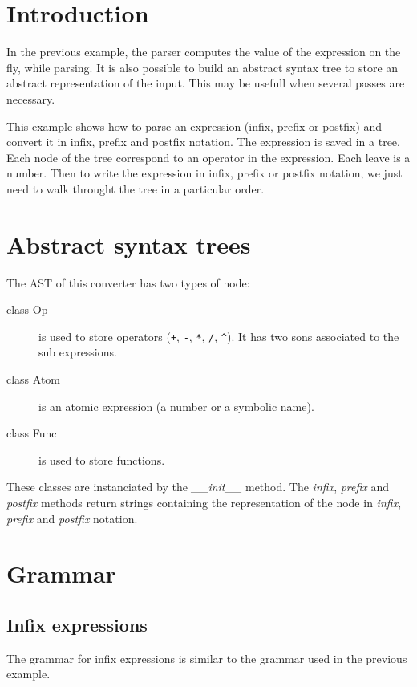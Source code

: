 \section{Introduction}

In the previous example, the parser computes the value of the expression on the fly, while parsing.
It is also possible to build an abstract syntax tree to store an abstract representation of the input.
This may be usefull when several passes are necessary.

This example shows how to parse an expression (infix, prefix or postfix) and convert it in infix, prefix and postfix notation.
The expression is saved in a tree. Each node of the tree correspond to an operator in the expression. Each leave is a number.
Then to write the expression in infix, prefix or postfix notation, we just need to walk throught the tree in a particular order.

\section{Abstract syntax trees}

The AST of this converter has two types of node:

\begin{description}
    \item [class Op] is used to store operators (\verb$+$, \verb$-$, \verb$*$, \verb$/$, \verb$^$).
        It has two sons associated to the sub expressions.
    \item [class Atom] is an atomic expression (a number or a symbolic name).
    \item [class Func] is used to store functions.
\end{description}

These classes are instanciated by the \emph{\_\_init\_\_} method. The \emph{infix}, \emph{prefix} and \emph{postfix} methods return strings containing the representation of the node in \emph{infix}, \emph{prefix} and \emph{postfix} notation.

\section{Grammar}

\subsection{Infix expressions}

The grammar for infix expressions is similar to the grammar used in the previous example.

